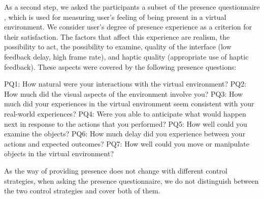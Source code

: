 \documentclass[10pt, conference]{IEEEtran}
\begin{document}
As a second step, we asked the participants a subset of the presence questionnaire \cite{presence_questionnaire}, which is used for measuring user's feeling of being present in a virtual environment. We consider user's degree of presence experience as a criterion for their satisfaction. The factors that affect this experience are realism, the possibility to act, the possibility to examine, quality of the interface (low feedback delay, high frame rate), and haptic quality (appropriate use of haptic feedback). These aspects were covered by the following presence questions:  

PQ1: How natural were your interactions with the virtual environment?
PQ2: How much did the visual aspects of the environment involve you?
PQ3: How much did your experiences in the virtual environment seem consistent with your real-world experiences?
PQ4: Were you able to anticipate what would happen next in response to the actions that you performed?
PQ5: How well could you examine the objects?
PQ6: How much delay did you experience between your actions and expected outcomes?
PQ7: How well could you move or manipulate objects in the virtual environment?

As the way of providing presence does not change with different control strategies, when asking the presence questionnaire, we do not distinguish between the two control strategies and cover both of them.
\end{document}
